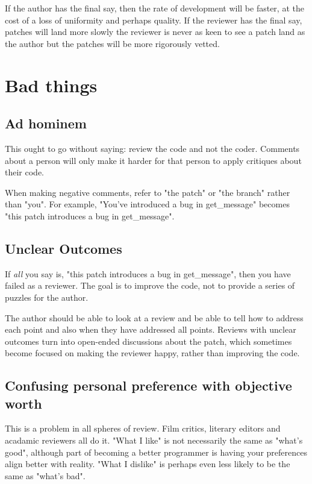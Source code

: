 \documentclass{article}
\begin{document}
If the author has the final say, then the rate of development will be faster, at the cost of a loss of uniformity and perhaps quality. If the reviewer has the final say, patches will land more slowly the reviewer is never as keen to see a patch land as the author but the patches will be more rigorously vetted.


\section{Bad things}

\subsection{Ad hominem}

This ought to go without saying: review the code and not the coder. Comments about a person will only make it harder for that person to apply critiques about their code.

When making negative comments, refer to "the patch" or "the branch" rather than "you". For example, "You've introduced a bug in get\_message" becomes "this patch introduces a bug in get\_message".

\subsection{Unclear Outcomes}

If {\it all} you say is, "this patch introduces a bug in get\_message", then you have failed as a reviewer. The goal is to improve the code, not to provide a series of puzzles for the author.

The author should be able to look at a review and be able to tell how to address each point and also when they have addressed all points. Reviews with unclear outcomes turn into open-ended discussions about the patch, which sometimes become focused on making the reviewer happy, rather than improving the code.

\subsection{Confusing personal preference with objective worth}

This is a problem in all spheres of review. Film critics, literary editors and acadamic reviewers all do it. "What I like" is not necessarily the same as "what's good", although part of becoming a better programmer is having your preferences align better with reality. "What I dislike" is perhaps even less likely to be the same as "what's bad".
\end{document}
